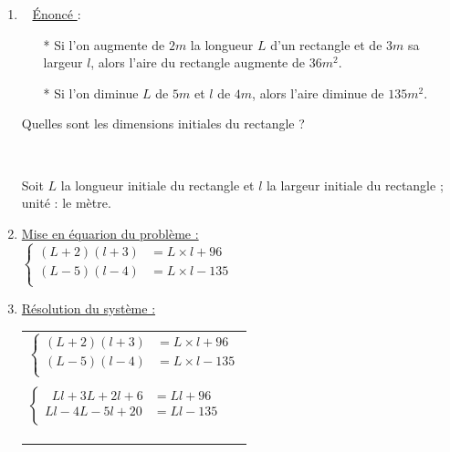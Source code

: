 \begin{enumerate}
\reversemarginpar 
\item \marginpar[\underline{Ex \no 2}]~ \underline{ Énoncé }:\\

\begin{itemize}
\item [*] Si l'on augmente de $2m$ la longueur $L$ d'un rectangle et de $3m$ sa largeur $l$, alors l'aire du rectangle augmente de $36m^{2}$.
\item [*] Si l'on diminue $L$ de $5m$ et $l$ de $4m$, alors l'aire diminue de $135m^{2}$. 
\end{itemize}

Quelles sont les dimensions initiales du rectangle ? 

\bigskip 

~\parbox{9cm}{Soit $L$ la longueur initiale du rectangle et $l$ la largeur initiale du rectangle ; unité : le mètre.}

\bigskip 

\item \underline{Mise en équarion du problème :  }\\

$\begin{cases}
(L+2)(l+3) \!\!\!\!\!\!\!\!&= L{\times}l + 96 \\
(L-5)(l-4) \!\!\!\!\!\!\!\!&= L{\times}l -135 \\
\end{cases}$ \\


\item \underline{Résolution du système : }\\


\begin{tabular}{lp{3cm}ll}
\multicolumn{4}{l}{
$\begin{cases}
(L+2)(l+3)\!\!\!\!\!\!\!\! &= L{\times}l + 96 \\
(L-5)(l-4) \!\!\!\!\!\!\!\!&= L{\times}l -135 \\
\end{cases}$} \\
& & & \\
\multicolumn{4}{l}{
$\begin{cases}
\;\; Ll +3L +2l +6  \!\!\!\!\!\!\!\!&= Ll + 96 \\
Ll -4L -5l +20 \!\!\!\!\!\!\!\!&= Ll -135 \\
\end{cases}$ } \\
& & & \\
\begin{minipage}{4cm}
$\begin{cases}
\;\; \; 3L +2l  \!\!\!\!\!\!\!\!&= \quad 90 \\
-4L -5l \!\!\!\!\!\!\!\!&= -155 \\
\end{cases}$ \\


\end{minipage}
\end{tabular}
\end{enumerate}
